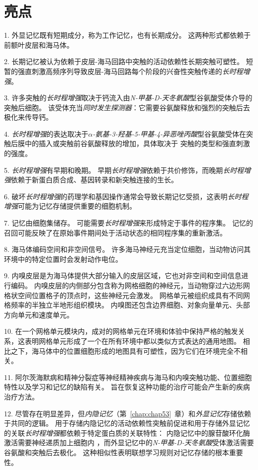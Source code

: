 \section{亮点}

1. 外显记忆既有短期成分，称为工作记忆，也有长期成分。
这两种形式都依赖于前额叶皮层和海马体。 


2. 长期记忆被认为依赖于皮层-海马回路中突触的活动依赖性长期突触可塑性。
短暂的强直刺激高频序列导致皮层-海马回路每个阶段的兴奋性突触传递的\textit{长时程增强}。


3. 许多突触的\textit{长时程增强}取决于钙流入由\textit{N-甲基-D-天冬氨酸}型谷氨酸受体介导的突触后细胞。
该受体充当\textit{同时发生探测器}：它需要谷氨酸释放和强烈的突触后去极化来传导钙。 


4. \textit{长时程增强}的表达取决于\textit{$\alpha$-氨基-3-羟基-5-甲基-4-异恶唑丙酸}型谷氨酸受体在突触后膜中的插入或突触前谷氨酸释放的增加，具体取决于 突触的类型和强直刺激的强度。


5. \textit{长时程增强}有早期和晚期。
早期\textit{长时程增强}依赖于共价修饰，而晚期\textit{长时程增强}依赖于新蛋白质合成、基因转录和新突触连接的生长。


6. 破坏\textit{长时程增强}的药理学和基因操作通常会导致长期记忆受损，这表明\textit{长时程增强}可能为记忆存储提供重要的细胞机制。


7. 记忆由细胞集储存。
可能需要\textit{长时程增强}来形成特定于事件的程序集。
记忆的召回可能反映了在原始事件期间处于活动状态的相同程序集的重新激活。


8. 海马体编码空间和非空间信号。
许多海马神经元充当定位细胞，当动物访问其环境中的特定位置时会发射动作电位。


9. 内嗅皮层是为海马体提供大部分输入的皮层区域，它也对非空间和空间信息进行编码。
内嗅皮层的内侧部分包含称为网格细胞的神经元，当动物穿过六边形网格状空间位置格子的顶点时，这些神经元会激发。
网格单元被组织成具有不同网格频率的半独立半地形组织模块。
内嗅图还包含边界细胞、对象向量单元、头部方向单元和速度单元。


10. 在一个网格单元模块内，成对的网格单元在环境和体验中保持严格的触发关系，这表明网格单元形成了一个在所有环境中都以类似方式表达的通用地图。
相比之下，海马体中的位置细胞形成的地图具有可塑性，因为它们在环境完全不相关。


11. 阿尔茨海默病和精神分裂症等神经精神疾病与海马和内嗅突触功能、位置细胞特性以及学习和记忆的缺陷有关。
旨在恢复这种功能的治疗可能会产生新的疾病治疗方法。 


12. 尽管存在明显差异，但\textit{内隐记忆}（第~\ref{chap:chap53}~章）和\textit{外显记忆}存储依赖于共同的逻辑。
用于存储内隐记忆的活动依赖性突触前促进和用于存储外显记忆的关联\textit{长时程增强}都依赖于特定蛋白质的关联特性：
内隐记忆中的腺苷酸环化酶激活需要神经递质加上细胞内 ，而外显记忆中的\textit{N-甲基-D-天冬氨酸}受体激活需要谷氨酸和突触后去极化。
这种相似性表明联想学习规则对记忆存储的根本重要性。






